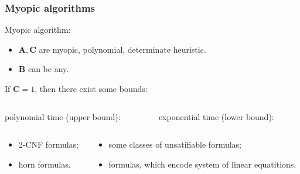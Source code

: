 \begin{frame}
    \frametitle{Myopic algorithms}

    \pause

    \begin{definition}
		Myopic algorithm:
        \begin{itemize}
            \pause
	        \item $\mathbf{A}, \mathbf{C}$ are myopic, polynomial, determinate heuristic.
            \pause
        	\item $\mathbf{B}$ can be any.
        \end{itemize}
	\end{definition}

    \pause
    If $\mathbf{C} = 1$, then there exist some bounds: 

    \pause
    \begin{columns}
        \begin{column}{5cm}
            
            polynomial time (upper bound):
        \end{column}
        \begin{column}{5cm}
            
            exponential time (lower bound):
        \end{column}
    \end{columns}

    \pause
    \begin{columns}
        \begin{column}{5cm}
            \begin{itemize}
		 		\item $2$-CNF formulas;
			    \pause
    			\item horn formulas.
            \end{itemize}
        \end{column}
        \begin{column}{5cm}
            \begin{itemize}
	            \pause
    	        \item some classes of unsatifiable formulas;
        		\pause
            	\item formulas, which encode system of linear
		            equatitions.
            \end{itemize}
        \end{column}
    \end{columns}
\end{frame}


